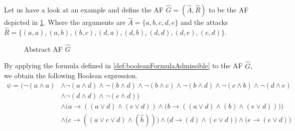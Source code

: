 \begin{example}
    Let us have a look at an example and define the AF $\hat{G}=(\hat{A},\hat{R})$ to be the AF depicted in \cref{af:algorithmEncodingsAdmissible}. Where the arguments are $\hat{A}=\{a, b, c, d, e\}$ and the attacks $\hat{R}=\big\{ (a,a), (a,b), (b,c), (d,a), (d,b), (d,d), (d, e), (e, d)\big\}$.

    \begin{figure}[H]
        \centering
        \caption{Abstract AF $\hat{G}$}
        \label{af:algorithmEncodingsAdmissible}
    \end{figure}

By applying the formula defined in \cref{def:booleanFormulaAdmissible} to the AF $\hat{G}$, we obtain the following Boolean expression.
\begin{align*}
    \psi = \big(
    \lnot (a \land a)
    & \land \lnot (a \land d) \land \lnot (b \land d) \land \lnot (b \land c) \land \lnot (b \land d) \land \lnot (c \land b) \land \lnot (d \land e) \\
    & \land \lnot (d \land d) \land \lnot (e \land d) \big) \\
    & \land \bigl( a \rightarrow ((a \lor d) \land (e \lor d)) \land \bigl( b \rightarrow ((a \lor d) \land (b) \land (e \lor d)) \bigl) \bigl)\\
    & \land \bigl( c \rightarrow ((a \lor c \lor d) \land (\hat{h})) \bigl) \land \bigl( d \rightarrow (d) \land (e \lor d) \bigl) \land \bigl( e \rightarrow (e \lor d) \bigl)
\end{align*}


\end{example}
